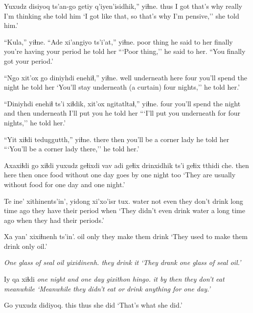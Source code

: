 \documentclass[12pt]{article}
\begin{document}
\gll Yuxudz disiyoq ts'an-go   getiy  q'iyen'isidhik,'' yiɬne.
thus   {I got}   {that's why}  really {I'm thinking} {she told him}
\glt `I got like that, so that's why I'm pensive,'' she told him.'
\glend

\gll ``Kula,'' yiɬne. ``Ade    xi'angiyo              ts'i'at,'' yiɬne.
{poor thing} {he said to her} finally {you're having your period}  {}  {he told her}
\glt ```Poor thing,'' he said to her. ``You finally got your period.'
\glend

\gll ``Ngo  xit'ox     go   diniyhdi enehiɬ,''      yiɬne.
well underneath here four     {you'll spend the night} {he told her}
\glt `You'll stay underneath (a curtain) four nights,'' he told her.'
\glend

\gll ``Diniyhdi enehiɬ      ts'i xiɬdik, xit'ox     ngitatltaɬ,''   yiɬne.
four     {you'll spend the night} and then underneath {I'll put you} {he told her}
\glt ```I'll put you underneath for four nights,'' he told her.'
\glend

\gll ``Yit   xiɬdi teduggutth,''                yiɬne.
there then   {you'll be a corner lady} {he told her}
\glt ```You'll be a corner lady there,'' he told her.'
\glend

\gll Axaxiɬdi go   xiɬdi yuxudz geɬixdi vav  adi    geɬix drinxidhik ts'i geɬix tthidi che. 
then     here then    {}   once    food without one  {day goes by} {} one  night  too
\glt `They are usually without food for one day and one night.'
\glend

\gll Te    ine'     {xithinents'in', } yidong          {xi'xo'isr} tux. 
water {not even} {they don't drink} {long time ago} {they have their period} when 
\glt `They didn't even drink water a long time ago when they had their periods.'
\glend

\gll Xa  yan' xixiɬnenh ts'in'.
oil only {they make them drink}
\glt `They used to make them drink only oil.'
\glend

\gll \em{One glass of seal oil} yixidinenh.
{} {they drink it}
\glt `They drank one glass of seal oil.'
\glend

\gll Iy qa xiɬdi \em{one night and one day} gixithon                hingo.
it {by}  then  {}                    {they don't eat} meanwhile
\glt `Meanwhile they didn't eat or drink anything for one day.'
\glend

\gll Go   yuxudz didiyoq. 
this thus   {she did}
\glt `That's what she did.'
\glend
\end{document}
